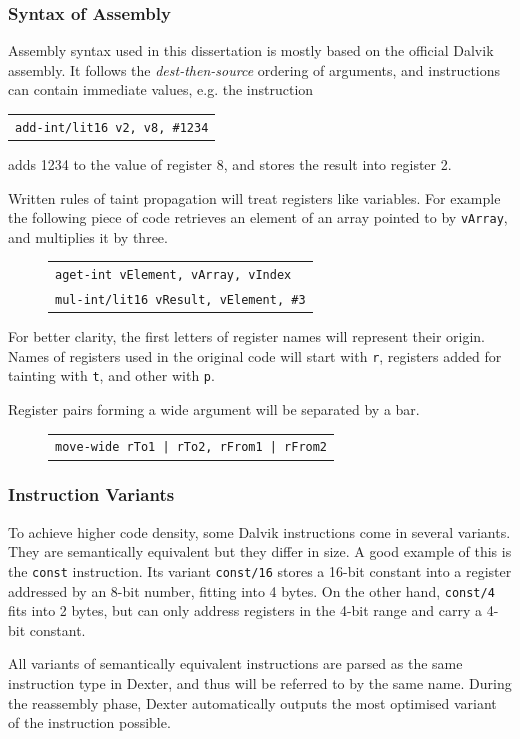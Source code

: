 \documentclass[12pt,twoside,notitlepage]{report}
\newcommand{\centerbox}[1] {
	\begin{center}
	\begin{footnotesize}
	\begin{tabular}{l}
		#1
	\end{tabular}
	\end{footnotesize}
	\end{center}
}
\newcommand{\asm}[1] {\texttt{#1}}
\begin{document}
\subsubsection{Syntax of Assembly}
Assembly syntax used in this dissertation is mostly based on the official Dalvik assembly. It follows the \emph{dest-then-source} ordering of arguments, and instructions can contain immediate values, e.g. the instruction
		\centerbox{
			\asm{add-int/lit16 v2, v8, \#1234}
		}
adds 1234 to the value of register 8, and stores the result into register 2. 

Written rules of taint propagation will treat registers like variables. For example the following piece of code retrieves an element of an array pointed to by \verb$vArray$, and multiplies it by three.
	\begin{figure}[H]
		\centerbox{
			\asm{aget-int vElement, vArray, vIndex} \\
			\asm{mul-int/lit16 vResult, vElement, \#3}
		}
	\end{figure}

For better clarity, the first letters of register names will represent their origin. Names of registers used in the original code will start with \verb$r$, registers added for tainting with \verb$t$, and other with \verb$p$.

Register pairs forming a wide argument will be separated by a bar.
	\begin{figure}[H]
		\centerbox{
			\asm{move-wide rTo1 | rTo2, rFrom1 | rFrom2}
		}
	\end{figure}

\subsubsection{Instruction Variants}

To achieve higher code density, some Dalvik instructions come in several variants. They are semantically equivalent but they differ in size. A good example of this is the \verb$const$ instruction. Its variant \verb$const/16$ stores a 16-bit constant into a register addressed by an 8-bit number, fitting into 4 bytes. On the other hand, \verb$const/4$ fits into 2 bytes, but can only address registers in the 4-bit range and carry a 4-bit constant.

All variants of semantically equivalent instructions are parsed as the same instruction type in Dexter, and thus will be referred to  by the same name. During the reassembly phase, Dexter automatically outputs the most optimised variant of the instruction possible.
\end{document}
